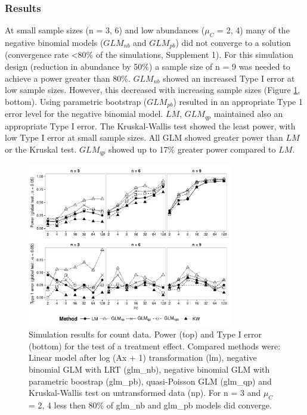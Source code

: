 \documentclass{scrartcl}
\begin{document}
\subsubsection{Results}
At small sample sizes (n = {3, 6}) and low abundances ($\mu_C$ = {2, 4}) many of the negative binomial models ($GLM_{nb}$ and $GLM_{pb}$) did not converge to a solution (convergence rate \textless 80\% of the simulations, Supplement 1). 
For this simulation design (reduction in abundance by 50\%) a sample size of n = 9 was needed to achieve a power greater than 80\%.
$GLM_{nb}$ showed an increased Type I error at low sample sizes. 
However, this decreased with increasing sample sizes (Figure \ref{fig:p_glob_c}, bottom).
Using parametric bootstrap ($GLM_{pb}$) resulted in an appropriate Type 1 error level for the negative binomial model.
$LM$, $GLM_{qp}$ maintained also an appropriate Type I error.
The Kruskal-Wallis test showed the least power, with low Type I error at small sample sizes. 
All GLM showed greater power than $LM$ or the Kruskal test. 
$GLM_{qp}$ showed up to 17\% greater power compared to $LM$.

\begin{figure}
  \centering
  \includegraphics[width = 0.8\textwidth]{p_glob_c.pdf}
  \caption{Simulation results for count data. Power (top) and Type I error (bottom) for the test of a treatment effect. Compared methods were: Linear model after log (Ax + 1) transformation (lm), negative binomial GLM with LRT (glm\_nb), negative binomial GLM with parametric boostrap (glm\_pb), quasi-Poisson GLM (glm\_qp) and Kruskal-Wallis test on untransformed data (np).
  For n = 3 and $\mu_C$ = {2, 4} less then 80\% of glm\_nb and glm\_pb models did converge.}
  \label{fig:p_glob_c}
\end{figure}
\end{document}
